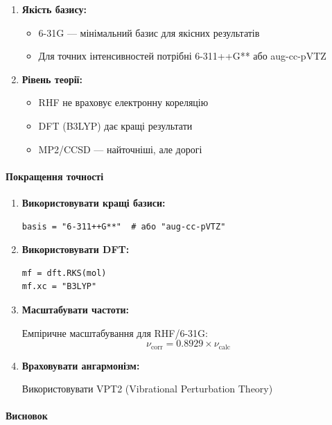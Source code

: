 {\begin{enumerate}
    \item \textbf{Якість базису:}
    \begin{itemize}
        \item 6-31G --- мінімальний базис для якісних результатів
        \item Для точних інтенсивностей потрібні 6-311++G** або aug-cc-pVTZ
    \end{itemize}

    \item \textbf{Рівень теорії:}
    \begin{itemize}
        \item RHF не враховує електронну кореляцію
        \item DFT (B3LYP) дає кращі результати
        \item MP2/CCSD --- найточніші, але дорогі
    \end{itemize}
\end{enumerate}

\paragraph{Покращення точності}

\begin{enumerate}
    \item \textbf{Використовувати кращі базиси:}
    \begin{verbatim}
basis = "6-311++G**"  # або "aug-cc-pVTZ"
    \end{verbatim}

    \item \textbf{Використовувати DFT:}
    \begin{verbatim}
mf = dft.RKS(mol)
mf.xc = "B3LYP"
    \end{verbatim}

    \item \textbf{Масштабувати частоти:}

    Емпіричне масштабування для RHF/6-31G:
    \begin{equation}
        \nu_{\text{corr}} = 0.8929 \times \nu_{\text{calc}}
    \end{equation}

    \item \textbf{Враховувати ангармонізм:}

    Використовувати VPT2 (Vibrational Perturbation Theory)
\end{enumerate}

\paragraph{Висновок}

}
